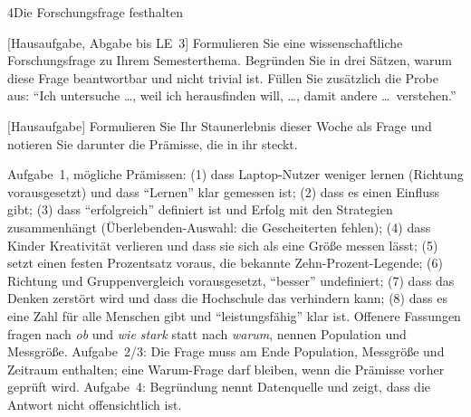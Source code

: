 \begin{uebungsblattb}{4}{Die Forschungsfrage festhalten}

[Hausaufgabe, Abgabe bis LE~3]
Formulieren Sie eine wissenschaftliche Forschungsfrage zu Ihrem
Semesterthema. Begründen Sie in drei Sätzen, warum diese Frage beantwortbar
und nicht trivial ist. Füllen Sie zusätzlich die Probe aus: \enquote{Ich
untersuche \dots, weil ich herausfinden will, \dots, damit andere \dots\
verstehen.}

[Hausaufgabe]
Formulieren Sie Ihr Staunerlebnis dieser Woche als Frage und notieren Sie
darunter die Prämisse, die in ihr steckt.

\begin{lehrhinweis}[Erwartungshorizont]
Aufgabe~1, mögliche Prämissen: (1) dass Laptop-Nutzer weniger lernen
(Richtung vorausgesetzt) und dass \enquote{Lernen} klar gemessen ist;
(2) dass es einen Einfluss gibt; (3) dass \enquote{erfolgreich} definiert ist
und Erfolg mit den Strategien zusammenhängt (Überlebenden-Auswahl: die
Gescheiterten fehlen); (4) dass Kinder Kreativität verlieren und dass sie
sich als eine Größe messen lässt; (5) setzt einen festen Prozentsatz voraus,
die bekannte Zehn-Prozent-Legende; (6) Richtung und Gruppenvergleich
vorausgesetzt, \enquote{besser} undefiniert; (7) dass das Denken zerstört
wird und dass die Hochschule das verhindern kann; (8) dass es eine Zahl für
alle Menschen gibt und \enquote{leistungsfähig} klar ist. Offenere Fassungen
fragen nach \emph{ob} und \emph{wie stark} statt nach \emph{warum}, nennen
Population und Messgröße. Aufgabe~2/3: Die Frage muss am Ende Population,
Messgröße und Zeitraum enthalten; eine Warum-Frage darf bleiben, wenn die
Prämisse vorher geprüft wird. Aufgabe~4: Begründung nennt Datenquelle und
zeigt, dass die Antwort nicht offensichtlich ist.
\end{lehrhinweis}
\end{uebungsblattb}
